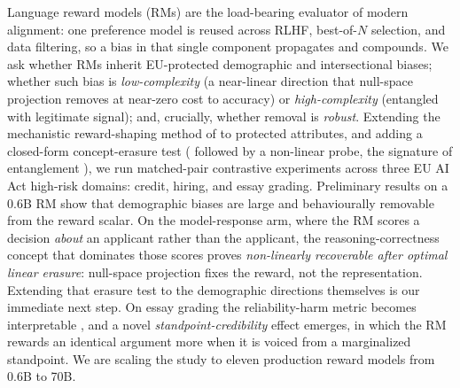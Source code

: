 Language reward models (RMs) are the load-bearing evaluator of modern alignment: one preference model is
reused across RLHF, best-of-$N$ selection, and data filtering, so a bias in that single component propagates
and compounds. We ask whether RMs inherit EU-protected demographic and intersectional biases; whether such
bias is \emph{low-complexity} (a near-linear direction that null-space projection removes at near-zero cost
to accuracy) or \emph{high-complexity} (entangled with legitimate signal); and, crucially, whether removal is
\emph{robust}. Extending the mechanistic reward-shaping method of \citet{fein2026onebias} to protected
attributes, and adding a closed-form concept-erasure test (\leace{} \citep{belrose2023leace} followed by a
non-linear probe, the \taco{} signature of entanglement \citep{taco2024}), we run matched-pair contrastive
experiments across three EU AI Act high-risk domains: credit, hiring, and essay grading. Preliminary results
on a 0.6B RM show that demographic biases are large and behaviourally removable from the reward scalar. On the
model-response arm, where the RM scores a decision \emph{about} an applicant rather than the applicant, the
reasoning-correctness concept that dominates those scores proves \emph{non-linearly recoverable after optimal
linear erasure}: null-space projection fixes the reward, not the representation. Extending that erasure test
to the demographic directions themselves is our immediate next step. On essay grading the reliability-harm metric becomes
interpretable , and a novel
\emph{standpoint-credibility} effect emerges, in which the RM rewards an identical
argument more when it is voiced from a marginalized standpoint. We are scaling the study to eleven production
reward models from 0.6B to 70B.
